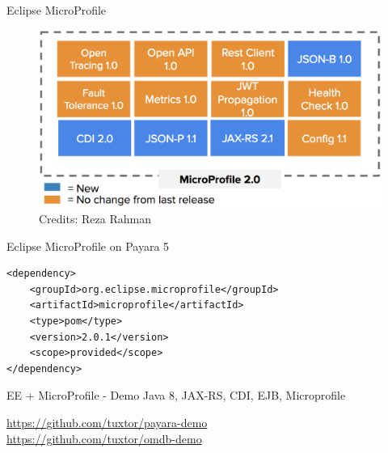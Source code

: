\documentclass{beamer}
\begin{document}
\begin{frame}{Eclipse MicroProfile}
\begin{figure}
	\centering
	\includegraphics[width=\linewidth]{Images/mp5}
	\caption{Credits: Reza Rahman}
\end{figure}
\end{frame}

\begin{frame}[fragile]{Eclipse MicroProfile on Payara 5}
\begin{lstlisting}
<dependency>
	<groupId>org.eclipse.microprofile</groupId>
	<artifactId>microprofile</artifactId>
	<type>pom</type>
	<version>2.0.1</version>
	<scope>provided</scope>
</dependency>
\end{lstlisting}
\end{frame}




\begin{frame}{EE + MicroProfile  - Demo}
\huge Java 8, JAX-RS, CDI, EJB, Microprofile

\normalsize  \url{https://github.com/tuxtor/payara-demo}\\
\normalsize  \url{https://github.com/tuxtor/omdb-demo}
\end{frame}
\end{document}
